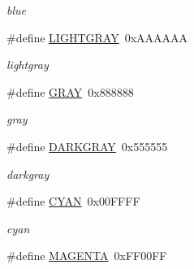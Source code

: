 \begin{CompactItemize}
\begin{CompactList}\small\item\em blue \item\end{CompactList}\item 
\hypertarget{group__hgdi__colors24_g04c5c34bd701165eade98623d1cc0020}{
\#define \hyperlink{group__hgdi__colors24_g04c5c34bd701165eade98623d1cc0020}{LIGHTGRAY}~0xAAAAAA}
\label{group__hgdi__colors24_g04c5c34bd701165eade98623d1cc0020}

\begin{CompactList}\small\item\em lightgray \item\end{CompactList}\item 
\hypertarget{group__hgdi__colors24_ge5f70677050eecd8909e0248e07b9e73}{
\#define \hyperlink{group__hgdi__colors24_ge5f70677050eecd8909e0248e07b9e73}{GRAY}~0x888888}
\label{group__hgdi__colors24_ge5f70677050eecd8909e0248e07b9e73}

\begin{CompactList}\small\item\em gray \item\end{CompactList}\item 
\hypertarget{group__hgdi__colors24_g4c08a6ce38e246fb2e4443329645aa5a}{
\#define \hyperlink{group__hgdi__colors24_g4c08a6ce38e246fb2e4443329645aa5a}{DARKGRAY}~0x555555}
\label{group__hgdi__colors24_g4c08a6ce38e246fb2e4443329645aa5a}

\begin{CompactList}\small\item\em darkgray \item\end{CompactList}\item 
\hypertarget{group__hgdi__colors24_gd243f93c16bc4c1d3e0a13b84421d760}{
\#define \hyperlink{group__hgdi__colors24_gd243f93c16bc4c1d3e0a13b84421d760}{CYAN}~0x00FFFF}
\label{group__hgdi__colors24_gd243f93c16bc4c1d3e0a13b84421d760}

\begin{CompactList}\small\item\em cyan \item\end{CompactList}\item 
\hypertarget{group__hgdi__colors24_g6f699060902f800f12aaae150f3a708e}{
\#define \hyperlink{group__hgdi__colors24_g6f699060902f800f12aaae150f3a708e}{MAGENTA}~0xFF00FF}
\label{group__hgdi__colors24_g6f699060902f800f12aaae150f3a708e}


\end{CompactItemize}

